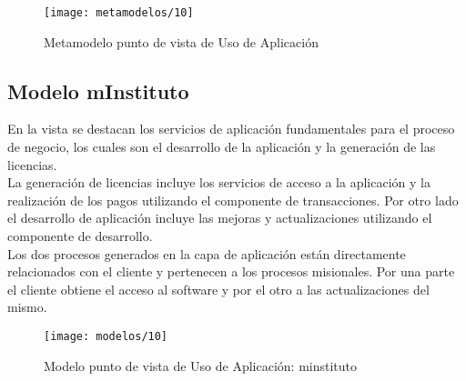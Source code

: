   \begin{figure}[H]
  	\centering
  	\texttt{[image: metamodelos/10]}
  	\captionsetup{width=.95\textwidth}
  	\caption{Metamodelo punto de vista de Uso de Aplicación}
  	\label{metamodelo10}
  \end{figure}
  
  \subsection{Modelo mInstituto}
  En la vista se destacan los servicios de aplicación fundamentales para el proceso de negocio, los cuales son el desarrollo de la aplicación y la generación de las licencias. \\
  
  La generación de licencias incluye los servicios de acceso a la aplicación y la realización de los pagos utilizando el componente de transacciones. Por otro lado el desarrollo de aplicación incluye las mejoras y actualizaciones utilizando el componente de desarrollo.\\
  
  Los dos procesos generados en la capa de aplicación están directamente relacionados con el cliente y pertenecen a los procesos misionales. Por una parte el cliente obtiene el acceso al software y por el otro a las actualizaciones del mismo.
  
  \begin{figure}[H]
  	\centering
  	\texttt{[image: modelos/10]}
  	\captionsetup{width=.95\textwidth}
  	\caption{Modelo punto de vista de Uso de Aplicación: minstituto}
  	\label{modelo10}
  \end{figure}